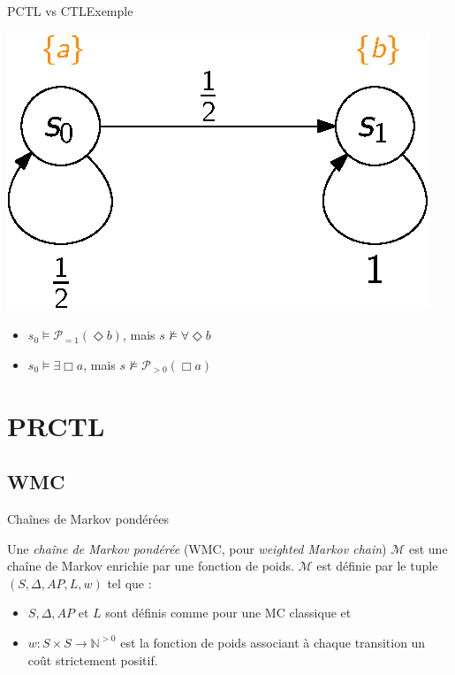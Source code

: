 \documentclass[compress]{beamer}
\begin{document}
\begin{frame}{PCTL vs CTL}{Exemple}
  \begin{center}
    \includegraphics[width=0.5\linewidth]{resources/PCTL_CTL}
  \end{center}
  \begin{itemize}
    \item $s_0 \models \mathcal{P}_{=1}(\Diamond b)$, mais $s \not \models \forall \Diamond b$
    \item $s_0 \models \exists \Box a$, mais $s \not \models \mathcal{P}_{>0}(\Box a)$
  \end{itemize}
\end{frame}

\section{PRCTL}
\subsection{WMC}
\begin{frame}{Chaînes de Markov pondérées}
  \begin{definition}
    Une \textit{chaîne de Markov pondérée} (WMC, pour \textit{weighted Markov chain}) $\mathcal{M}$ est une chaîne de Markov enrichie par une fonction de poids. $\mathcal{M}$ est définie par le tuple $(S, \Delta, AP, L, w)$
    tel que :
    \begin{itemize}
      \item $S, \Delta, AP$ et $L$ sont définis comme pour une MC classique et
      \item $w : S \times S \rightarrow \mathbb{N}^{>0}$ est la fonction
        de poids associant à chaque transition un coût strictement positif.
    \end{itemize}
  \end{definition}
\end{frame}
\end{document}
